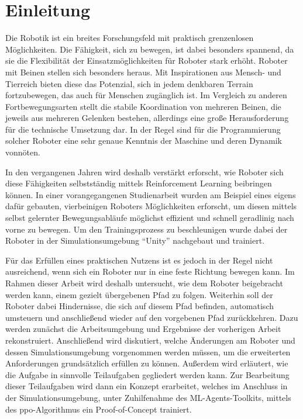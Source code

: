 \chapter{Einleitung}
Die Robotik ist ein breites Forschungsfeld mit praktisch grenzenlosen Möglichkeiten.
Die Fähigkeit, sich zu bewegen, ist dabei besonders spannend, da sie die Flexibilität der Einsatzmöglichkeiten für Roboter stark erhöht.
Roboter mit Beinen stellen sich besonders heraus.
Mit Inspirationen aus Mensch- und Tierreich bieten diese das Potenzial, sich in jedem denkbaren Terrain fortzubewegen, das auch für Menschen zugänglich ist.
Im Vergleich zu anderen Fortbewegungsarten stellt die stabile Koordination von mehreren Beinen, die jeweils aus mehreren Gelenken bestehen, allerdings eine große Herausforderung für die technische Umsetzung dar.
In der Regel sind für die Programmierung solcher Roboter eine sehr genaue Kenntnis der Maschine und deren Dynamik vonnöten.

In den vergangenen Jahren wird deshalb verstärkt erforscht, wie Roboter sich diese Fähigkeiten selbstständig mittels Reinforcement Learning beibringen können.
In einer vorangegangenen Studienarbeit wurden am Beispiel eines eigens dafür gebauten, vierbeinigen Roboters Möglichkeiten erforscht, um diesen mittels selbst gelernter Bewegungsabläufe möglichst effizient und schnell geradlinig nach vorne zu bewegen.
Um den Trainingsprozess zu beschleunigen wurde dabei der Roboter in der Simulationsumgebung \enquote{Unity} nachgebaut und trainiert.

Für das Erfüllen eines praktischen Nutzens ist es jedoch in der Regel nicht ausreichend, wenn sich ein Roboter nur in eine feste Richtung bewegen kann.
Im Rahmen dieser Arbeit wird deshalb untersucht, wie dem Roboter beigebracht werden kann, einem gezielt übergebenen Pfad zu folgen.
Weiterhin soll der Roboter dabei Hindernisse, die sich auf diesem Pfad befinden, automatisch umsteuern und anschließend wieder auf den vorgebenen Pfad zurückkehren. %
Dazu werden zunächst die Arbeitsumgebung und Ergebnisse der vorherigen Arbeit rekonstruiert.
Anschließend wird diskutiert, welche Änderungen am Roboter und dessen Simulationsumgebung vorgenommen werden müssen, um die erweiterten Anforderungen grundsätzlich erfüllen zu können.
Außerdem wird erläutert, wie die Aufgabe in sinnvolle Teilaufgaben gegliedert werden kann.
Zur Bearbeitung dieser Teilaufgaben wird dann ein Konzept erarbeitet, welches im Anschluss in der Simulationsumgebung, unter Zuhilfenahme des ML-Agents-Toolkits, mittels des \acl{ppo}-Algorithmus ein Proof-of-Concept trainiert.

